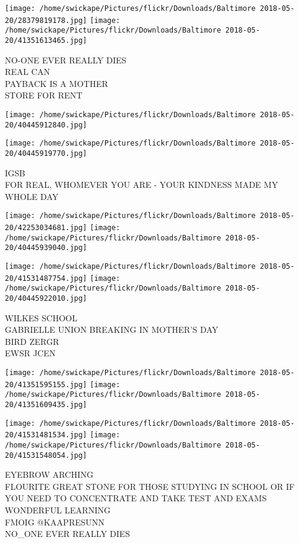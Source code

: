 \documentclass[10pt,letterpaper]{article}
\begin{document}
\texttt{[image: /home/swickape/Pictures/flickr/Downloads/Baltimore 2018-05-20/28379819178.jpg]}
\texttt{[image: /home/swickape/Pictures/flickr/Downloads/Baltimore 2018-05-20/41351613465.jpg]}

NO{-}ONE EVER REALLY DIES\\
REAL CAN\\
PAYBACK IS A MOTHER\\
STORE FOR RENT
\pagebreak

\texttt{[image: /home/swickape/Pictures/flickr/Downloads/Baltimore 2018-05-20/40445912840.jpg]}

\vspace{0.25in}
\texttt{[image: /home/swickape/Pictures/flickr/Downloads/Baltimore 2018-05-20/40445919770.jpg]}

IGSB\\
FOR REAL, WHOMEVER YOU ARE {-} YOUR KINDNESS MADE MY WHOLE DAY
\pagebreak

\texttt{[image: /home/swickape/Pictures/flickr/Downloads/Baltimore 2018-05-20/42253034681.jpg]}
\texttt{[image: /home/swickape/Pictures/flickr/Downloads/Baltimore 2018-05-20/40445939040.jpg]}

\texttt{[image: /home/swickape/Pictures/flickr/Downloads/Baltimore 2018-05-20/41531487754.jpg]}
\texttt{[image: /home/swickape/Pictures/flickr/Downloads/Baltimore 2018-05-20/40445922010.jpg]}

WILKES SCHOOL\\
GABRIELLE UNION BREAKING IN MOTHER'S DAY\\
BIRD ZERGR\\
EWSR JCEN
\pagebreak

\texttt{[image: /home/swickape/Pictures/flickr/Downloads/Baltimore 2018-05-20/41351595155.jpg]}
\texttt{[image: /home/swickape/Pictures/flickr/Downloads/Baltimore 2018-05-20/41351609435.jpg]}

\texttt{[image: /home/swickape/Pictures/flickr/Downloads/Baltimore 2018-05-20/41531481534.jpg]}
\texttt{[image: /home/swickape/Pictures/flickr/Downloads/Baltimore 2018-05-20/41531548054.jpg]}

EYEBROW ARCHING\\
FLOURITE GREAT STONE FOR THOSE STUDYING IN SCHOOL OR IF YOU NEED TO CONCENTRATE AND TAKE TEST AND EXAMS WONDERFUL LEARNING\\
FMOIG @KAAPRESUNN\\
NO\_ONE EVER  REALLY DIES
\pagebreak
\end{document}
